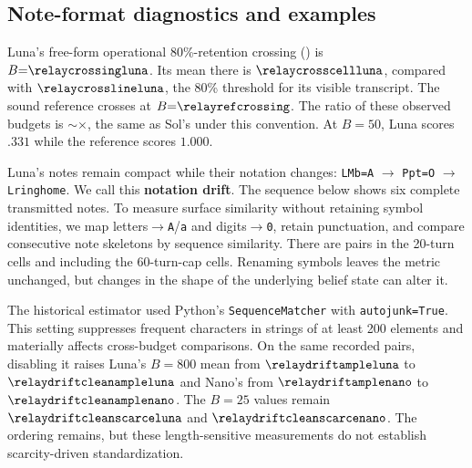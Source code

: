 \subsection{Note-format diagnostics and examples}\label{app:format}\label{app:drift}
Luna's free-form operational 80\%-retention crossing () is $B{=}\relaycrossingluna$. Its mean there is $\relaycrosscellluna$, compared with $\relaycrosslineluna$, the 80\% threshold for its visible transcript. The sound reference crosses at $B{=}\relayrefcrossing$. The ratio of these observed budgets is $\sim$\relaytaxluna$\times$, the same as Sol's under this convention. At $B{=}50$, Luna scores $.331$ while the reference scores $1.000$.

Luna's notes remain compact while their notation changes: \texttt{LMb=A} $\to$ \texttt{Ppt=O} $\to$ \texttt{Lringhome}. We call this \textbf{notation drift}. The sequence below shows six complete transmitted notes. To measure surface similarity without retaining symbol identities, we map letters$\to$\texttt{A}/\texttt{a} and digits$\to$\texttt{0}, retain punctuation, and compare consecutive note skeletons by sequence similarity. There are \relaydriftpairsstd{} pairs in the 20-turn cells and \relaydriftpairsall{} including the 60-turn-cap cells. Renaming symbols leaves the metric unchanged, but changes in the shape of the underlying belief state can alter it.

\begin{table}[htbp]
\centering
\small
\caption{Descriptive note-format metrics for free-form notes at $B{=}100$. Similarity is the historical mean over adjacent nonempty, letter/digit-normalized note pairs, using \texttt{SequenceMatcher(autojunk=True)}. The syntax share is the fraction of notes containing \texttt{=} or \texttt{:}; it does not verify factual content. $n$ counts episodes; pair counts and nonempty-note counts give the separate denominators. The text reports sensitivity to the estimator and terminal-note inclusion.}
\label{tab:drift}

\end{table}

The historical estimator used Python's \texttt{SequenceMatcher} with \texttt{autojunk=True}. This setting suppresses frequent characters in strings of at least 200 elements and materially affects cross-budget comparisons. On the same recorded pairs, disabling it raises Luna's $B{=}800$ mean from $\relaydriftampleluna$ to $\relaydriftcleanampleluna$ and Nano's from $\relaydriftamplenano$ to $\relaydriftcleanamplenano$. The $B{=}25$ values remain $\relaydriftcleanscarceluna$ and $\relaydriftcleanscarcenano$. The ordering remains, but these length-sensitive measurements do not establish scarcity-driven standardization.

